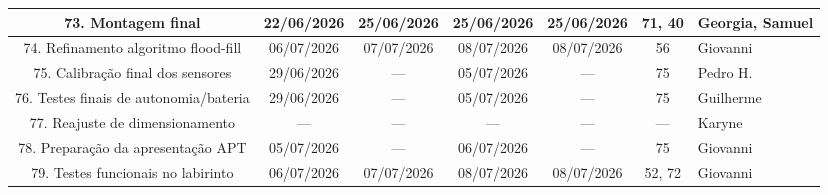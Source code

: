 \begin{landscape}
\begin{center}
\begin{longtable}{|c|c|c|c|c|c|p{3.6cm}|}
73. Montagem final & 22/06/2026 & 25/06/2026 & 25/06/2026 & 25/06/2026 & 71, 40 & Georgia, Samuel \\ \hline
74. Refinamento algoritmo flood-fill & 06/07/2026 & 07/07/2026 & 08/07/2026 & 08/07/2026 & 56 & Giovanni \\ \hline
75. Calibração final dos sensores & 29/06/2026 & --- & 05/07/2026 & --- & 75 & Pedro H. \\ \hline
76. Testes finais de autonomia/bateria & 29/06/2026 & --- & 05/07/2026 & --- & 75 & Guilherme \\ \hline
77. Reajuste de dimensionamento & --- & --- & --- & --- & --- & Karyne \\ \hline
78. Preparação da apresentação APT & 05/07/2026 & --- & 06/07/2026 & --- & 75 & Giovanni \\ \hline
79. Testes funcionais no labirinto & 06/07/2026 & 07/07/2026 & 08/07/2026 & 08/07/2026 & 52, 72 & Giovanni \\ \hline

\end{longtable}
\renewcommand{\arraystretch}{1}
\normalsize
\end{center}


\end{landscape}
